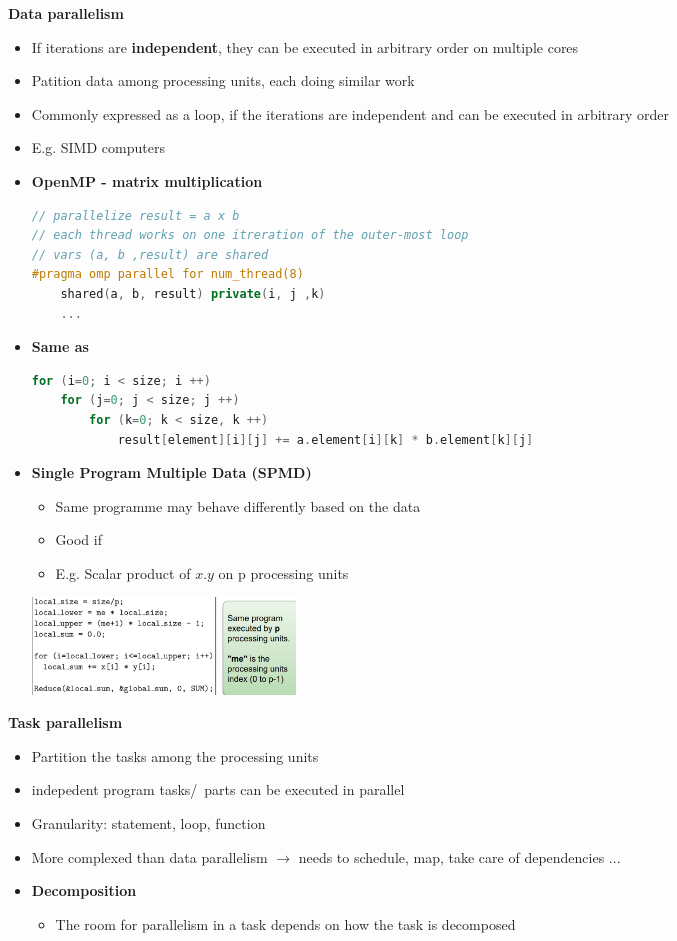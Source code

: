\documentclass[10pt, landscape]{article}
\begin{document}
\begin{multicols}{4}
\textbf{Data parallelism}
\begin{itemize}
    \item If iterations are \textbf{independent}, they can be executed in arbitrary order on multiple cores
    \item Patition data among processing units, each doing similar work 
    \item Commonly expressed as a loop, if the iterations are independent and can be executed in arbitrary order
    \item E.g. SIMD computers
    \item \textbf{OpenMP - matrix multiplication} 
    \begin{lstlisting}[language=C++, breaklines=true, breakatwhitespace=true]
// parallelize result = a x b
// each thread works on one itreration of the outer-most loop 
// vars (a, b ,result) are shared
#pragma omp parallel for num_thread(8)
    shared(a, b, result) private(i, j ,k)
    ...
        \end{lstlisting}
    \item \textbf{Same as}
    \begin{lstlisting}[language=C++, breaklines=true, breakatwhitespace=true]
for (i=0; i < size; i ++) 
    for (j=0; j < size; j ++) 
        for (k=0; k < size, k ++) 
            result[element][i][j] += a.element[i][k] * b.element[k][j]
    \end{lstlisting}
    \item \textbf{Single Program Multiple Data (SPMD)}
    \begin{itemize}
        \item Same programme may behave differently based on the data
        \item Good if 
        \item E.g. Scalar product of $x.y$ on p processing units 
    \end{itemize}
\includegraphics*[width=7cm]{spmd}
\end{itemize}


\textbf{Task parallelism}
\begin{itemize}
    \item Partition the tasks among the processing units
    \item indepedent program tasks/\ parts can be executed in parallel
    \item Granularity: statement, loop, function 
    \item More complexed than data parallelism $\rightarrow$ needs to schedule, map, take care of dependencies ...
    \item \textbf{Decomposition}
    \begin{itemize}
        \item The room for parallelism in a task depends on how the task is decomposed
    \end{itemize}
\end{itemize}


\end{multicols}
\end{document}
